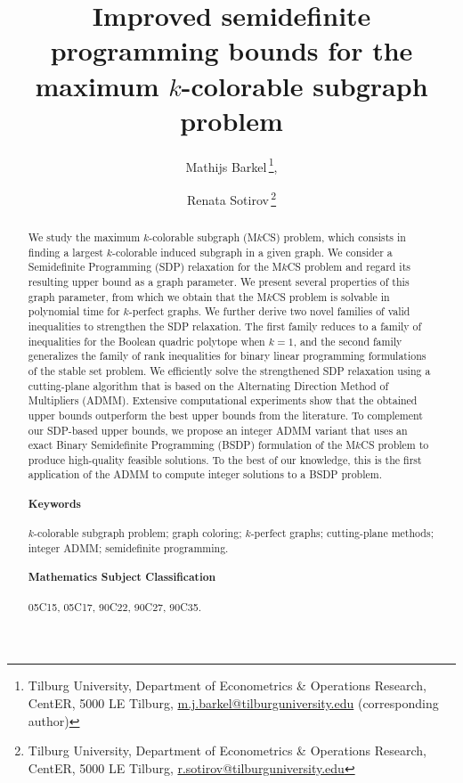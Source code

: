 \documentclass[11pt, a4paper]{article}
\begin{document}
\title{Improved semidefinite programming bounds for the maximum $k$-colorable subgraph problem}
\author{Mathijs Barkel\,\thanks{Tilburg University, Department of Econometrics \& Operations Research, CentER, 5000 LE Tilburg, 
\href{mailto:m.j.barkel@tilburguniversity.edu}{m.j.barkel@tilburguniversity.edu} (corresponding author)}, 
\and
Renata Sotirov\,\thanks{Tilburg University, Department of Econometrics \& Operations Research, CentER, 5000 LE Tilburg, 
\href{mailto:r.sotirov@tilburguniversity.edu}{r.sotirov@tilburguniversity.edu}}
}

\date{ }
\noindent
\maketitle

\begin{abstract}
We study the maximum $k$-colorable subgraph (M$k$CS) problem, which consists in finding  a largest $k$-colorable induced subgraph in a given graph.  
We consider a Semidefinite Programming (SDP) relaxation for the M$k$CS problem and regard its resulting upper bound as a graph parameter.
We present several properties of this graph parameter, from which we obtain that the M$k$CS problem is solvable in polynomial time for $k$-perfect graphs.
We further derive two novel families of valid inequalities to strengthen the SDP relaxation.
The first family reduces to a family of inequalities for the Boolean quadric polytope when $k=1$, and the second family generalizes the family of rank inequalities for binary linear programming formulations of the stable set problem.
We efficiently solve the strengthened SDP relaxation using a cutting-plane algorithm that is based on the Alternating Direction Method of Multipliers (ADMM). 
Extensive computational experiments show that the obtained upper bounds outperform the best upper bounds from the literature.
To complement our SDP-based upper bounds, we propose an integer ADMM variant that uses an exact Binary Semidefinite Programming (BSDP) formulation of the M$k$CS problem to produce high-quality feasible solutions. 
To the best of our knowledge, this is the first application of the ADMM to compute integer solutions to a BSDP problem.
\paragraph{Keywords} $k$-colorable subgraph problem; graph coloring; $k$-perfect graphs; cutting-plane methods; integer ADMM; semidefinite programming. 

\paragraph{Mathematics Subject Classification} {05C15, 05C17, 90C22, 90C27, 90C35.}
\end{abstract}
\end{document}
